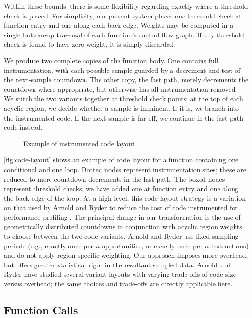 Within these bounds, there is some flexibility regarding exactly where
a threshold check is placed.  For simplicity, our present system
places one threshold check at function entry and one along each back
edge.  Weights may be computed in a single bottom-up traversal of each
function's control flow graph.  If any threshold check is found to
have zero weight, it is simply discarded.

We produce two complete copies of the function body.  One contains
full instrumentation, with each possible sample guarded by a decrement
and test of the next-sample countdown.  The other copy, the fast path,
merely decrements the countdown where appropriate, but otherwise has
all instrumentation removed.  We stitch the two variants together at
threshold check points: at the top of each acyclic region, we decide
whether a sample is imminent.  If it is, we branch into the
instrumented code.  If the next sample is far off, we continue in the
fast path code instead.


\begin{figure}
  \centering
  
  \caption{Example of instrumented code layout}
  \label{fig:code-layout}
\end{figure}

\autoref{fig:code-layout} shows an example of code layout for a
function containing one conditional and one loop.  Dotted nodes
represent instrumentation sites; these are reduced to mere countdown
decrements in the fast path.  The boxed nodes represent threshold
checks; we have added one at function entry and one along the back
edge of the loop.  At a high level, this code layout strategy is a
variation on that used by Arnold and Ryder to reduce the cost of code
instrumented for performance profiling \cite{Arnold:2001:FRC}.  The
principal change in our transformation is the use of geometrically
distributed countdowns in conjunction with acyclic region weights to
choose between the two code variants.  Arnold and Ryder use fixed
sampling periods (e.g., exactly once per $n$ opportunities, or exactly
once per $n$ instructions) and do not apply region-specific weighting.
Our approach imposes more overhead, but offers greater statistical
rigor in the resultant sampled data.  Arnold and Ryder have studied
several variant layouts with varying trade-offs of code size versus
overhead; the same choices and trade-offs are directly applicable
here.

\subsection{Function Calls}

